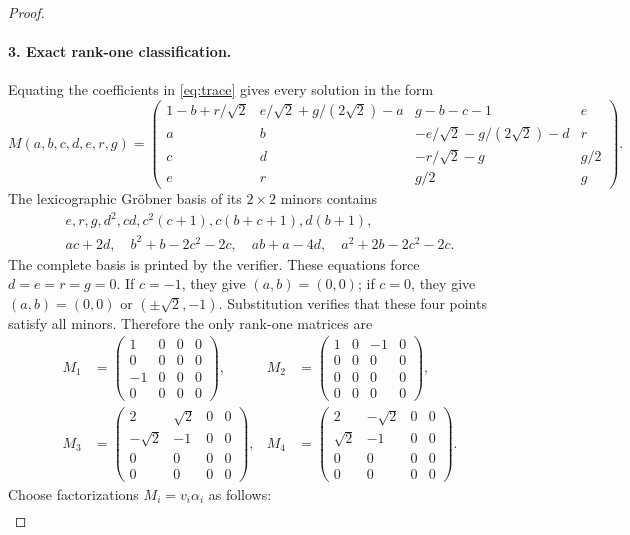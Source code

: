 \documentclass[11pt]{article}
\begin{document}
\begin{proof}
\paragraph{3. Exact rank-one classification.}
Equating the coefficients in \eqref{eq:trace} gives every solution in the form
\[
M(a,b,c,d,e,r,g)=
\begin{pmatrix}
1-b+r/\sqrt2&e/\sqrt2+g/(2\sqrt2)-a&g-b-c-1&e\\
a&b&-e/\sqrt2-g/(2\sqrt2)-d&r\\
c&d&-r/\sqrt2-g&g/2\\
e&r&g/2&g
\end{pmatrix}.
\]
The lexicographic Gr\"obner basis of its $2\times2$ minors contains
\begin{gather*}
e, r, g, d^2, cd, c^2(c+1), c(b+c+1), d(b+1),\\
a c+2d,\quad b^2+b-2c^2-2c,\quad ab+a-4d,\quad
a^2+2b-2c^2-2c.
\end{gather*}
The complete basis is printed by the verifier.  These equations force $d=e=r=g=0$.  If $c=-1$, they give $(a,b)=(0,0)$; if $c=0$, they give $(a,b)=(0,0)$ or $(\pm\sqrt2,-1)$.  Substitution verifies that these four points satisfy all minors.  Therefore the only rank-one matrices are
\begin{align*}
M_1&=\begin{pmatrix}1&0&0&0\\0&0&0&0\\-1&0&0&0\\0&0&0&0\end{pmatrix},&
M_2&=\begin{pmatrix}1&0&-1&0\\0&0&0&0\\0&0&0&0\\0&0&0&0\end{pmatrix},\\[1ex]
M_3&=\begin{pmatrix}2&\sqrt2&0&0\\-\sqrt2&-1&0&0\\0&0&0&0\\0&0&0&0\end{pmatrix},&
M_4&=\begin{pmatrix}2&-\sqrt2&0&0\\\sqrt2&-1&0&0\\0&0&0&0\\0&0&0&0\end{pmatrix}.
\end{align*}
Choose factorizations $M_i=v_i\alpha_i$ as follows:
\[
\begin{array}{c|c|c}

\end{array}\]
\end{proof}
\end{document}
